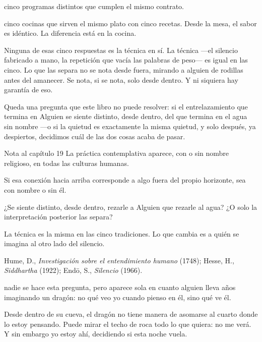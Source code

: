 \begin{fisica}
 cinco programas distintos que cumplen el mismo contrato.

 cinco cocinas que sirven el mismo plato con cinco recetas. Desde la mesa, el sabor es idéntico. La diferencia está en la cocina.
\end{fisica}
Ninguna de esas cinco respuestas es la técnica en sí. La técnica —el silencio fabricado a mano, la repetición que vacía las palabras de peso— es igual en las cinco. Lo que las separa no se nota desde fuera, mirando a alguien de rodillas antes del amanecer. Se nota, si se nota, solo desde dentro. Y ni siquiera hay garantía de eso.

Queda una pregunta que este libro no puede resolver: si el entrelazamiento que termina en Alguien se siente distinto, desde dentro, del que termina en el agua sin nombre —o si la quietud es exactamente la misma quietud, y solo después, ya despiertos, decidimos cuál de las dos cosas acaba de pasar.

\begin{notacap}{Nota al capítulo 19}
 La práctica contemplativa aparece, con o sin nombre religioso, en todas las culturas humanas.

 Si esa conexión hacia arriba corresponde a algo fuera del propio horizonte, sea con nombre o sin él.

 ¿Se siente distinto, desde dentro, rezarle a Alguien que rezarle al agua? ¿O solo la interpretación posterior las separa?

 La técnica es la misma en las cinco tradiciones. Lo que cambia es a quién se imagina al otro lado del silencio.

 Hume, D., \emph{Investigación sobre el entendimiento humano} (1748); Hesse, H., \emph{Siddhartha} (1922); Endō, S., \emph{Silencio} (1966).
\end{notacap}
\noindent {} nadie se hace esta pregunta, pero aparece sola en cuanto alguien lleva años imaginando un dragón: no qué veo yo cuando pienso en él, sino qué ve él.

Desde dentro de su cueva, el dragón no tiene manera de asomarse al cuarto donde lo estoy pensando. Puede mirar el techo de roca todo lo que quiera: no me verá. Y sin embargo yo estoy ahí, decidiendo si esta noche vuela.

